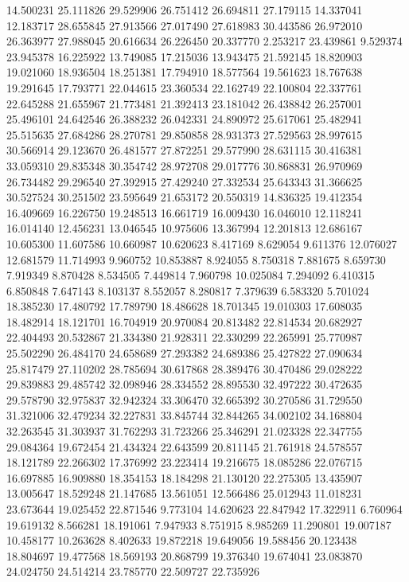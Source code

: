14.500231
25.111826
29.529906
26.751412
26.694811
27.179115
14.337041
12.183717
28.655845
27.913566
27.017490
27.618983
30.443586
26.972010
26.363977
27.988045
20.616634
26.226450
20.337770
2.253217
23.439861
9.529374
23.945378
16.225922
13.749085
17.215036
13.943475
21.592145
18.820903
19.021060
18.936504
18.251381
17.794910
18.577564
19.561623
18.767638
19.291645
17.793771
22.044615
23.360534
22.162749
22.100804
22.337761
22.645288
21.655967
21.773481
21.392413
23.181042
26.438842
26.257001
25.496101
24.642546
26.388232
26.042331
24.890972
25.617061
25.482941
25.515635
27.684286
28.270781
29.850858
28.931373
27.529563
28.997615
30.566914
29.123670
26.481577
27.872251
29.577990
28.631115
30.416381
33.059310
29.835348
30.354742
28.972708
29.017776
30.868831
26.970969
26.734482
29.296540
27.392915
27.429240
27.332534
25.643343
31.366625
30.527524
30.251502
23.595649
21.653172
20.550319
14.836325
19.412354
16.409669
16.226750
19.248513
16.661719
16.009430
16.046010
12.118241
16.014140
12.456231
13.046545
10.975606
13.367994
12.201813
12.686167
10.605300
11.607586
10.660987
10.620623
8.417169
8.629054
9.611376
12.076027
12.681579
11.714993
9.960752
10.853887
8.924055
8.750318
7.881675
8.659730
7.919349
8.870428
8.534505
7.449814
7.960798
10.025084
7.294092
6.410315
6.850848
7.647143
8.103137
8.552057
8.280817
7.379639
6.583320
5.701024
18.385230
17.480792
17.789790
18.486628
18.701345
19.010303
17.608035
18.482914
18.121701
16.704919
20.970084
20.813482
22.814534
20.682927
22.404493
20.532867
21.334380
21.928311
22.330299
22.265991
25.770987
25.502290
26.484170
24.658689
27.293382
24.689386
25.427822
27.090634
25.817479
27.110202
28.785694
30.617868
28.389476
30.470486
29.028222
29.839883
29.485742
32.098946
28.334552
28.895530
32.497222
30.472635
29.578790
32.975837
32.942324
33.306470
32.665392
30.270586
31.729550
31.321006
32.479234
32.227831
33.845744
32.844265
34.002102
34.168804
32.263545
31.303937
31.762293
31.723266
25.346291
21.023328
22.347755
29.084364
19.672454
21.434324
22.643599
20.811145
21.761918
24.578557
18.121789
22.266302
17.376992
23.223414
19.216675
18.085286
22.076715
16.697885
16.909880
18.354153
18.184298
21.130120
22.275305
13.435907
13.005647
18.529248
21.147685
13.561051
12.566486
25.012943
11.018231
23.673644
19.025452
22.871546
9.773104
14.620623
22.847942
17.322911
6.760964
19.619132
8.566281
18.191061
7.947933
8.751915
8.985269
11.290801
19.007187
10.458177
10.263628
8.402633
19.872218
19.649056
19.588456
20.123438
18.804697
19.477568
18.569193
20.868799
19.376340
19.674041
23.083870
24.024750
24.514214
23.785770
22.509727
22.735926
